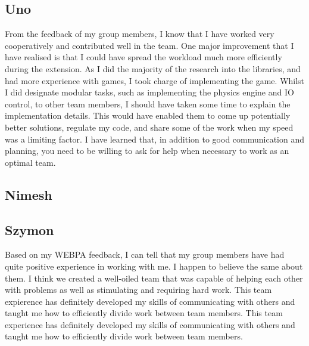 \documentclass[11pt]{article}
\begin{document}
\subsection{Uno}
From the feedback of my group members, I know that I have worked very cooperatively and contributed well in the team. One major improvement that I have realised is that I could have spread the workload much more efficiently during the extension. As I did the majority of the research into the libraries, and had more experience with games, I took charge of implementing the game. Whilst I did designate modular tasks, such as implementing the physics engine and IO control, to other team members, I should have taken some time to explain the implementation details. This would have enabled them to come up potentially better solutions, regulate my code, and share some of the work when my speed was a limiting factor. I have learned that, in addition to good communication and planning, you need to be willing to ask for help when necessary to work as an optimal team.
\subsection{Nimesh}
\subsection{Szymon}
Based on my WEBPA feedback, I can tell that my group members have had quite positive experience in working with me. I happen to believe the same about them. I think we created a well-oiled team that was capable of helping each other with problems as well as stimulating and requiring hard work. This team expierence has definitely developed my skills of communicating with others and taught me how to efficiently divide work between team members. This team experience has definitely developed my skills of communicating with others and taught me how to efficiently divide work between team members.
\end{document}
